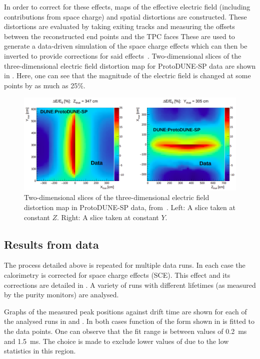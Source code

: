In order to correct for these effects, maps of the effective electric field (including contributions from space charge) and spatial distortions are constructed.
These distortions are evaluated by taking exiting tracks and measuring the offsets between the reconstructed end points and the TPC faces
These are used to generate a data-driven simulation of the space charge effects which can then be inverted to provide corrections for said effects~\cite{protodunePerformance}.
Two-dimensional slices of the three-dimensional electric field distortion map for ProtoDUNE-SP data are shown in . 
Here, one can see that the magnitude of the electric field is changed at some points by as much as 25\%.

\begin{figure}[h]
	\centering
	\includegraphics[width=.9\linewidth]{files/figures/protodune_calibration/eFieldDistortion}
	\caption[Two-dimensional slices of the three-dimensional electric field distortion map in ProtoDUNE-SP data]{Two-dimensional slices of the three-dimensional electric field distortion map in ProtoDUNE-SP data, from~\cite{protodunePerformance}. Left: A slice taken at constant $Z$. Right: A slice taken at constant $Y$.}
	\label{fig:eFieldDistortion}
\end{figure}

\subsection{Results from data}
\label{sec:pdune_calibration:lifetime:data}

The process detailed above is repeated for multiple data runs.
In each case the calorimetry is corrected for space charge effects (SCE). 
This effect and its corrections are detailed in .
A variety of runs with different lifetimes (as measured by the purity monitors) are analysed.

Graphs of the measured \dqdx peak positions against drift time are shown for each of the analysed runs in  and .
In both cases function of the form shown in  is fitted to the data points. 
One can observe that the fit range is between \tdrift values of \SI{0.2}{\ms} and \SI{1.5}{\ms}.
The choice is made to exclude lower values of \tdrift due to the low statistics in this region.

